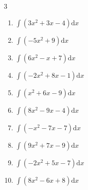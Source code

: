 \begin{multicols}{3}
\begin{enumerate}
  \item $\displaystyle \int \left( 3x^{2}+3x-4 \right) \mathrm{d}x$


\columnbreak %

  \item $\displaystyle \int \left( -5x^{2}+9 \right) \mathrm{d}x$


  \item $\displaystyle \int \left( 6x^{2}-x+7 \right) \mathrm{d}x$


  \item $\displaystyle \int \left( -2x^{2}+8x-1 \right) \mathrm{d}x$


  \item $\displaystyle \int \left( x^{2}+6x-9 \right) \mathrm{d}x$


  \item $\displaystyle \int \left( 8x^{2}-9x-4 \right) \mathrm{d}x$


  \item $\displaystyle \int \left( -x^{2}-7x-7 \right) \mathrm{d}x$


  \item $\displaystyle \int \left( 9x^{2}+7x-9 \right) \mathrm{d}x$


  \item $\displaystyle \int \left( -2x^{2}+5x-7 \right) \mathrm{d}x$


  \item $\displaystyle \int \left( 8x^{2}-6x+8 \right) \mathrm{d}x$



\end{enumerate}
\end{multicols}
